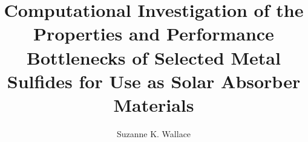 \documentclass[a4paper,12pt,twoside]{report}
\begin{document}
\title{\LARGE {\bf Computational Investigation of the Properties and Performance Bottlenecks of Selected Metal Sulfides for Use as Solar Absorber Materials}\\
 \vspace*{6mm}
}

\author{Suzanne K. Wallace}
\submitdate{\today}

\normallinespacing
\maketitle

\preface


%
%

\body







\appendix




\end{document}

